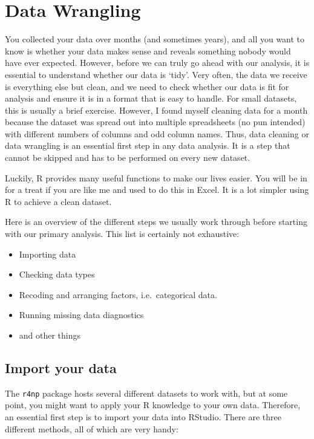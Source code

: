 \documentclass[
]{book}
\begin{document}
\hypertarget{data-wrangling}{%
\chapter{Data Wrangling}\label{data-wrangling}}

You collected your data over months (and sometimes years), and all you want to know is whether your data makes sense and reveals something nobody would have ever expected. However, before we can truly go ahead with our analysis, it is essential to understand whether our data is `tidy'. Very often, the data we receive is everything else but clean, and we need to check whether our data is fit for analysis and ensure it is in a format that is easy to handle. For small datasets, this is usually a brief exercise. However, I found myself cleaning data for a month because the dataset was spread out into multiple spreadsheets (no pun intended) with different numbers of columns and odd column names. Thus, data cleaning or data wrangling is an essential first step in any data analysis. It is a step that cannot be skipped and has to be performed on every new dataset.

Luckily, R provides many useful functions to make our lives easier. You will be in for a treat if you are like me and used to do this in Excel. It is a lot simpler using R to achieve a clean dataset.

Here is an overview of the different steps we usually work through before starting with our primary analysis. This list is certainly not exhaustive:

\begin{itemize}
\item
  Importing data
\item
  Checking data types
\item
  Recoding and arranging factors, i.e.~categorical data.
\item
  Running missing data diagnostics
\item
  and other things
\end{itemize}

\hypertarget{import-your-data}{%
\section{Import your data}\label{import-your-data}}

The \texttt{r4np} package hosts several different datasets to work with, but at some point, you might want to apply your R knowledge to your own data. Therefore, an essential first step is to import your data into RStudio. There are three different methods, all of which are very handy:
\end{document}

